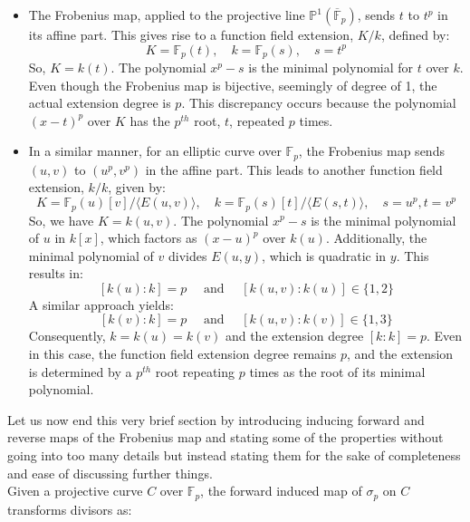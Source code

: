 \begin{example}
\hspace{1cm}
\begin{itemize}
    \item The Frobenius map, applied to the projective line \(\mathbb{P}^{1}\left(\overline{\mathbb{F}}_{p}\right)\), sends \(t\) to \(t^{p}\) in its affine part. This gives rise to a function field extension, \(K / k\), defined by:
\[
K=\mathbb{F}_{p}(t), \quad k=\mathbb{F}_{p}(s), \quad s=t^{p}
\] 
So, \(K=k(t)\). The polynomial \(x^{p}-s\) is the minimal polynomial for \(t\) over \(k\). Even though the Frobenius map is bijective, seemingly of degree of 1, the actual extension degree is \(p\). This discrepancy occurs because the polynomial \((x-t)^{p}\) over \(K\) has the \(p^{th}\) root, \(t\), repeated \(p\) times.

\item In a similar manner, for an elliptic curve over \(\mathbb{F}_{p}\), the Frobenius map sends \((u, v)\) to \(\left(u^{p}, v^{p}\right)\) in the affine part. This leads to another function field extension, \(k / k\), given by:
\[
K=\mathbb{F}_{p}(u)[v] /\langle E(u, v)\rangle, \quad k=\mathbb{F}_{p}(s)[t] /\langle E(s, t)\rangle, \quad s=u^{p}, t=v^{p}
\]
So, we have \(K=k(u, v)\). The polynomial \(x^{p}-s\) is the minimal polynomial of \(u\) in \(k[x]\), which factors as \((x-u)^{p}\) over \(k(u)\). Additionally, the minimal polynomial of \(v\) divides \(E(u, y)\), which is quadratic in \(y\). This results in:
\[
[k(u): k]=p \quad \text { and } \quad[k(u, v): k(u)] \in\{1,2\}
\]
A similar approach yields:
\[
[k(v): k]=p \quad \text { and } \quad[k(u, v): k(v)] \in\{1,3\}
\]
Consequently, \(k=k(u)=k(v)\) and the extension degree \( [k: k]=p \). Even in this case, the function field extension degree remains \(p\), and the extension is determined by a \(p^{th}\) root repeating \(p\) times as the root of its minimal polynomial.
 
\end{itemize}
\end{example}
Let us now end this very brief section by introducing inducing forward and reverse maps of the Frobenius map and stating some of the properties without going into too many details but instead stating them for the sake of completeness and ease of discussing further things.  \\

Given a projective curve \( C \) over \( \mathbb{F}_{p} \), the forward induced map of \( \sigma_{p} \) on \( C \) transforms divisors as:

